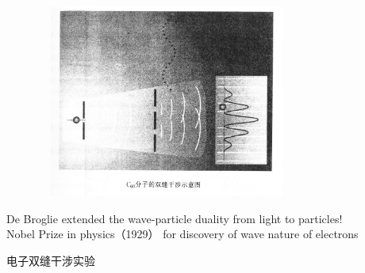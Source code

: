   \begin{frame}
      \frametitle{}
    \begin{center}
         \includegraphics[width=0.8\textwidth,height=2.5in]{figs/c60.png}
    \end{center}
  \end{frame}
\begin{frame} 
    \begin{tcolorbox}[colback=yellow!10,colframe=red!75!black,title=Significance]
        De Broglie extended the wave-particle duality from light to particles! \\
        {\color{deepred} Nobel Prize in physics（1929）} for discovery of wave nature of electrons
    \end{tcolorbox}  
\end{frame}

\begin{frame}{电子双缝干涉实验}
\end{frame}

